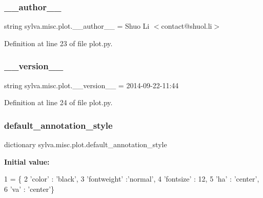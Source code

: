 \subsubsection{\texorpdfstring{\+\_\+\+\_\+author\+\_\+\+\_\+}{\_\_author\_\_}}
{\footnotesize\ttfamily string sylva.\+misc.\+plot.\+\_\+\+\_\+author\+\_\+\+\_\+ = \textquotesingle{}Shuo Li $<$contact@shuol.\+li$>$\textquotesingle{}\hspace{0.3cm}{\ttfamily [private]}}



Definition at line 23 of file plot.\+py.

\mbox{\label{namespacesylva_1_1misc_1_1plot_aeaebaa88de4546f2ce3ff8b7e568797e}} 
\subsubsection{\texorpdfstring{\+\_\+\+\_\+version\+\_\+\+\_\+}{\_\_version\_\_}}
{\footnotesize\ttfamily string sylva.\+misc.\+plot.\+\_\+\+\_\+version\+\_\+\+\_\+ = \textquotesingle{}2014-\/09-\/22-\/11\+:44\textquotesingle{}\hspace{0.3cm}{\ttfamily [private]}}



Definition at line 24 of file plot.\+py.

\mbox{\label{namespacesylva_1_1misc_1_1plot_affc8bfc885cfaf5e1995cf4fd8d084c6}} 
\subsubsection{\texorpdfstring{default\+\_\+annotation\+\_\+style}{default\_annotation\_style}}
{\footnotesize\ttfamily dictionary sylva.\+misc.\+plot.\+default\+\_\+annotation\+\_\+style}

{\bfseries Initial value\+:}
\begin{DoxyCode}
1 =  \{
2     \textcolor{stringliteral}{'color'} : \textcolor{stringliteral}{'black'},
3     \textcolor{stringliteral}{'fontweight'} :\textcolor{stringliteral}{'normal'},
4     \textcolor{stringliteral}{'fontsize'} : 12,
5     \textcolor{stringliteral}{'ha'} : \textcolor{stringliteral}{'center'},
6     \textcolor{stringliteral}{'va'} : \textcolor{stringliteral}{'center'}\}
\end{DoxyCode}


